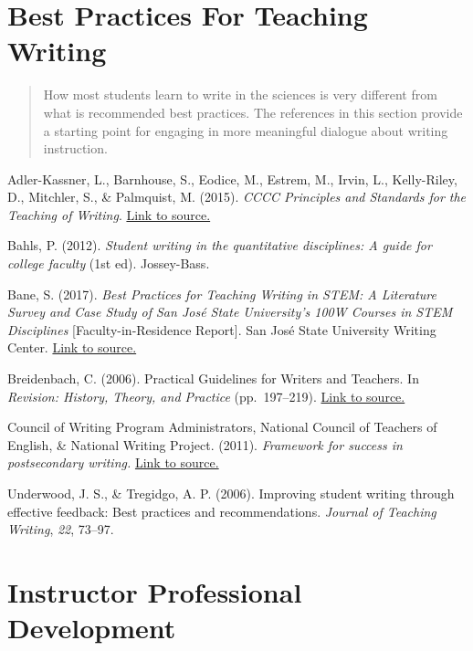 \documentclass[
]{book}
\begin{document}
\hypertarget{best-practices-for-teaching-writing}{%
\section{Best Practices For Teaching Writing}\label{best-practices-for-teaching-writing}}

\begin{quote}
How most students learn to write in the sciences is very different from what is recommended best practices. The references in this section provide a starting point for engaging in more meaningful dialogue about writing instruction.
\end{quote}

Adler-Kassner, L., Barnhouse, S., Eodice, M., Estrem, M., Irvin, L., Kelly-Riley, D., Mitchler, S., \& Palmquist, M. (2015). \emph{CCCC Principles and Standards for the Teaching of Writing}. \href{https://cccc.ncte.org/cccc/resources/positions/postsecondarywriting}{Link to source.}

Bahls, P. (2012). \emph{Student writing in the quantitative disciplines: A guide for college faculty} (1st ed). Jossey-Bass.

Bane, S. (2017). \emph{Best Practices for Teaching Writing in STEM: A Literature Survey and Case Study of San José State University's 100W Courses in STEM Disciplines} {[}Faculty-in-Residence Report{]}. San José State University Writing Center. \href{https://www.sjsu.edu/wac/pages/presentations/resources/BaneSTEMPaperforWC.pdf}{Link to source.}

Breidenbach, C. (2006). Practical Guidelines for Writers and Teachers. In \emph{Revision: History, Theory, and Practice} (pp.~197--219). \href{https://wac.colostate.edu/docs/books/horning_revision/chapter11.pdf}{Link to source.}

Council of Writing Program Administrators, National Council of Teachers of English, \& National Writing Project. (2011). \emph{Framework for success in postsecondary writing.} \href{http://wpacouncil.org/files/framework-for-\%20success-postsecondary-writing.pdf}{Link to source.}

Underwood, J. S., \& Tregidgo, A. P. (2006). Improving student writing through effective feedback: Best practices and recommendations. \emph{Journal of Teaching Writing}, \emph{22}, 73--97.

\hypertarget{instructor-professional-development}{%
\section{Instructor Professional Development}\label{instructor-professional-development}}
\end{document}
